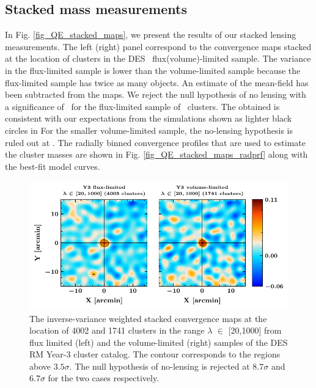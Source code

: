 \subsection{Stacked mass measurements}
\label{sec_temp_results}
In Fig. \ref{fig_QE_stacked_maps}, we present the results of our stacked lensing measurements. 
The left (right) panel correspond to the convergence maps stacked at the location of clusters in the DES \whichyear\ flux(volume)-limited sample.
The variance in the flux-limited sample is lower than the volume-limited sample because the flux-limited sample has twice as many objects. 
An estimate of the mean-field has been subtracted from the maps.
We reject the null hypothesis of no lensing with a significance of \howmanysigmaforfullsample\ for the flux-limited sample of \howmanyclustersinfullsample\ clusters. 
The obtained \snr{} is consistent with our expectations from the simulations shown as lighter black circles in %
For the smaller volume-limited sample, the no-lensing hypothesis is ruled out at  \howmanysigmaforcosmosample.
The radially binned convergence profiles that are used to estimate the cluster masses are shown in Fig. \ref{fig_QE_stacked_maps_radprf} along with the best-fit model curves. 
\begin{figure}
\includegraphics[width=\linewidth]{figs/kappa_model_MF_y3_v6_4_22_full_vl_JODY.pdf}
\caption{The inverse-variance weighted stacked convergence maps at the location of 4002 and 1741 clusters in the range $\lambda$ $\in$ [20,1000] from flux limited (left) and the volume-limited (right) samples of the DES RM Year-3 cluster catalog. The contour corresponds to the regions above $3.5 \sigma$. The null hypothesis of no-lensing is rejected at $8.7\sigma$ and $6.7 \sigma $ for the two cases respectively.}
\label{fig:fig_QE_stacked_maps}
\end{figure}

